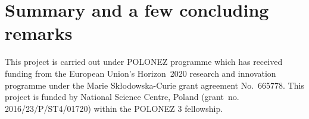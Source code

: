 

\section{\label{s:6}Summary and a few concluding remarks}


\begin{acknowledgments}
This project is carried out under POLONEZ programme which has received funding from the European Union's
Horizon~2020 research and innovation programme under the Marie Skłodowska-Curie grant agreement 
No.~665778. This project is funded by National Science Centre, Poland 
(grant~no. 2016/23/P/ST4/01720) within the POLONEZ 3 fellowship.
\end{acknowledgments}

